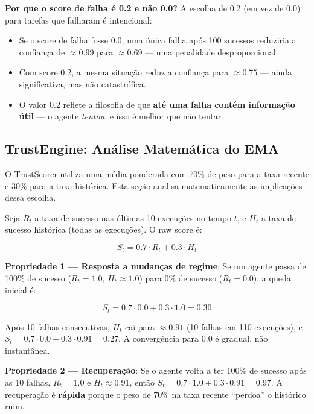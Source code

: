 \textbf{Por que o score de falha é 0.2 e não 0.0?} A escolha de 0.2 (em vez de 0.0) para tarefas que falharam é intencional:

\begin{itemize}
    \item Se o score de falha fosse 0.0, uma única falha após 100 sucessos reduziria a confiança de $\approx 0.99$ para $\approx 0.69$ — uma penalidade desproporcional.
    \item Com score 0.2, a mesma situação reduz a confiança para $\approx 0.75$ — ainda significativa, mas não catastrófica.
    \item O valor 0.2 reflete a filosofia de que \textbf{até uma falha contém informação útil} — o agente \textit{tentou}, e isso é melhor que não tentar.
\end{itemize}

\subsection{TrustEngine: Análise Matemática do EMA}

O TrustScorer utiliza uma média ponderada com 70\% de peso para a taxa recente e 30\% para a taxa histórica. Esta seção analisa matematicamente as implicações dessa escolha.

Seja $R_t$ a taxa de sucesso nas últimas 10 execuções no tempo $t$, e $H_t$ a taxa de sucesso histórica (todas as execuções). O raw score é:

\begin{equation}
S_t = 0.7 \cdot R_t + 0.3 \cdot H_t
\label{eq:raw-score}
\end{equation}

\textbf{Propriedade 1 — Resposta a mudanças de regime}: Se um agente passa de 100\% de sucesso ($R_t = 1.0$, $H_t \approx 1.0$) para 0\% de sucesso ($R_t = 0.0$), a queda inicial é:

$$S_t = 0.7 \cdot 0.0 + 0.3 \cdot 1.0 = 0.30$$

Após 10 falhas consecutivas, $H_t$ cai para $\approx 0.91$ (10 falhas em 110 execuções), e $S_t = 0.7 \cdot 0.0 + 0.3 \cdot 0.91 = 0.27$. A convergência para 0.0 é gradual, não instantânea.

\textbf{Propriedade 2 — Recuperação}: Se o agente volta a ter 100\% de sucesso após as 10 falhas, $R_t = 1.0$ e $H_t \approx 0.91$, então $S_t = 0.7 \cdot 1.0 + 0.3 \cdot 0.91 = 0.97$. A recuperação é \textbf{rápida} porque o peso de 70\% na taxa recente ``perdoa'' o histórico ruim.

